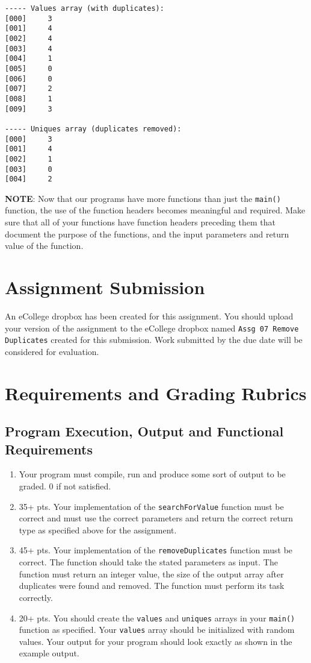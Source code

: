 \documentclass[11pt]{article}
\begin{document}
\begin{verbatim}
----- Values array (with duplicates):
[000]     3
[001]     4
[002]     4
[003]     4
[004]     1
[005]     0
[006]     0
[007]     2
[008]     1
[009]     3

----- Uniques array (duplicates removed):
[000]     3
[001]     4
[002]     1
[003]     0
[004]     2
\end{verbatim}


\textbf{NOTE}: Now that our programs have more functions than just the
\verb~main()~ function, the use of the function headers becomes meaningful
and required.  Make sure that all of your functions have function
headers preceding them that document the purpose of the functions, and
the input parameters and return value of the function.
\section*{Assignment Submission}
\label{sec-4}

An eCollege dropbox has been created for this assignment.  You should
upload your version of the assignment to the eCollege dropbox named
\verb~Assg 07 Remove Duplicates~ created for this submission.  Work
submitted by the due date will be considered for evaluation.
\section*{Requirements and Grading Rubrics}
\label{sec-5}

\subsection*{Program Execution, Output and Functional Requirements}
\label{sec-5-1}

\begin{enumerate}
\item Your program must compile, run and produce some sort of output to
be graded. 0 if not satisfied.
\item 35+ pts.  Your implementation of the \verb~searchForValue~ function must
be correct and must use the correct parameters and return the
correct return type as specified above for the assignment.
\item 45+ pts. Your implementation of the \verb~removeDuplicates~ function
must be correct.  The function should take the stated parameters as
input.  The function must return an integer value, the size of the
output array after duplicates were found and removed.  The function
must perform its task correctly.
\item 20+ pts. You should create the \verb~values~ and \verb~uniques~ arrays in
your \verb~main()~ function as specified.  Your \verb~values~ array should be
initialized with random values.  Your output for your program
should look exactly as shown in the example output.
\end{enumerate}
\end{document}
